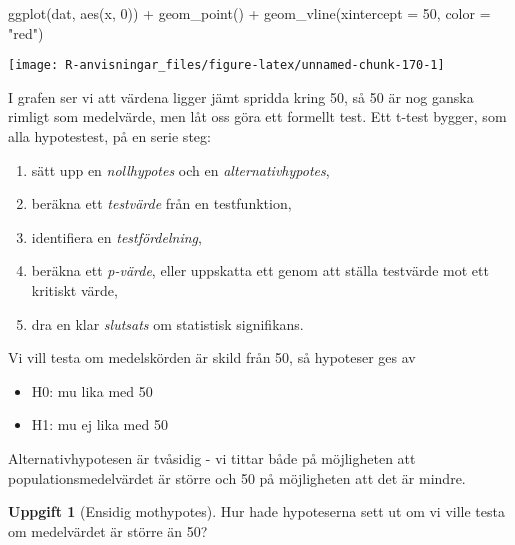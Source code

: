 \documentclass[
]{book}
\newenvironment{Shaded}{\begin{snugshade}}{\end{snugshade}}
\newcommand{\AttributeTok}[1]{\textcolor[rgb]{0.77,0.63,0.00}{#1}}
\newcommand{\DecValTok}[1]{\textcolor[rgb]{0.00,0.00,0.81}{#1}}
\newcommand{\FunctionTok}[1]{\textcolor[rgb]{0.00,0.00,0.00}{#1}}
\newcommand{\NormalTok}[1]{#1}
\newcommand{\SpecialCharTok}[1]{\textcolor[rgb]{0.00,0.00,0.00}{#1}}
\newcommand{\StringTok}[1]{\textcolor[rgb]{0.31,0.60,0.02}{#1}}
\providecommand{\tightlist}{%
  \setlength{\itemsep}{0pt}\setlength{\parskip}{0pt}}
\theoremstyle{definition}
\theoremstyle{definition}
\theoremstyle{definition}
\newtheorem{exercise}{Uppgift}[chapter]
\theoremstyle{definition}
\theoremstyle{remark}
\begin{document}
\begin{Shaded}
\begin{Highlighting}[]
\FunctionTok{ggplot}\NormalTok{(dat, }\FunctionTok{aes}\NormalTok{(x, }\DecValTok{0}\NormalTok{)) }\SpecialCharTok{+} 
  \FunctionTok{geom\_point}\NormalTok{() }\SpecialCharTok{+}
  \FunctionTok{geom\_vline}\NormalTok{(}\AttributeTok{xintercept =} \DecValTok{50}\NormalTok{, }\AttributeTok{color =} \StringTok{"red"}\NormalTok{)}
\end{Highlighting}
\end{Shaded}

\begin{center}\texttt{[image: R-anvisningar\_files/figure-latex/unnamed-chunk-170-1]} \end{center}

I grafen ser vi att värdena ligger jämt spridda kring 50, så 50 är nog ganska rimligt som medelvärde, men låt oss göra ett formellt test. Ett t-test bygger, som alla hypotestest, på en serie steg:

\begin{enumerate}
\def\labelenumi{\arabic{enumi}.}
\tightlist
\item
  sätt upp en \emph{nollhypotes} och en \emph{alternativhypotes},
\item
  beräkna ett \emph{testvärde} från en testfunktion,
\item
  identifiera en \emph{testfördelning},
\item
  beräkna ett \emph{p-värde}, eller uppskatta ett genom att ställa testvärde mot ett kritiskt värde,
\item
  dra en klar \emph{slutsats} om statistisk signifikans.
\end{enumerate}

Vi vill testa om medelskörden är skild från 50, så hypoteser ges av

\begin{itemize}
\tightlist
\item
  H0: mu lika med 50
\item
  H1: mu ej lika med 50
\end{itemize}

Alternativhypotesen är tvåsidig - vi tittar både på möjligheten att populationsmedelvärdet är större och 50 på möjligheten att det är mindre.

\begin{exercise}[Ensidig mothypotes]
Hur hade hypoteserna sett ut om vi ville testa om medelvärdet är större än 50?
\end{exercise}
\end{document}
